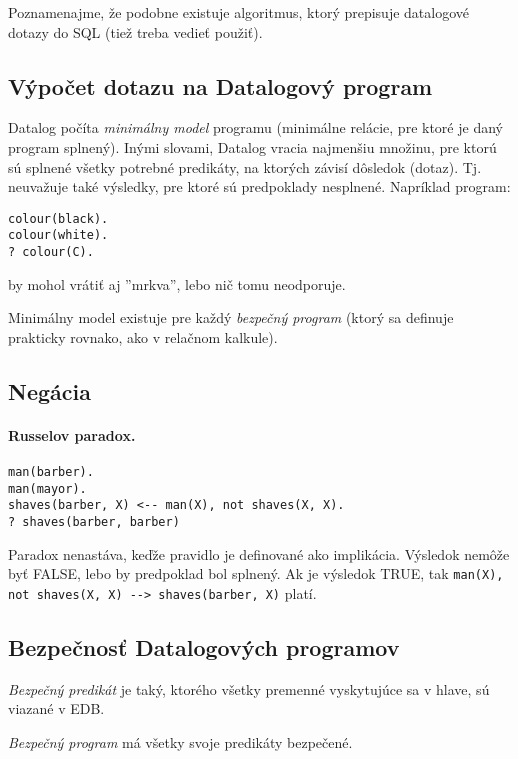 \documentclass[10pt,a4paper]{article}
\begin{document}
Poznamenajme, že podobne existuje algoritmus, ktorý prepisuje datalogové dotazy do SQL (tiež treba vedieť použiť). 

\subsection{Výpočet dotazu na Datalogový program}

Datalog počíta \emph{minimálny model} programu (minimálne relácie, pre ktoré je daný program splnený). Inými slovami, Datalog vracia najmenšiu množinu, pre ktorú sú splnené všetky potrebné predikáty, na ktorých závisí dôsledok (dotaz). Tj. neuvažuje také výsledky, pre ktoré sú predpoklady nesplnené. Napríklad program: 
\begin{verbatim}
colour(black).
colour(white).
? colour(C).
\end{verbatim}
by mohol vrátiť aj ''mrkva'', lebo nič tomu neodporuje.

Minimálny model existuje pre každý \emph{bezpečný program} (ktorý sa definuje prakticky rovnako, ako v relačnom kalkule).

\subsection{Negácia}

\paragraph{Russelov paradox.}
\begin{verbatim}
man(barber).
man(mayor).
shaves(barber, X) <-- man(X), not shaves(X, X).
? shaves(barber, barber)
\end{verbatim}

Paradox nenastáva, keďže pravidlo je definované ako implikácia. Výsledok nemôže byť FALSE,
lebo by predpoklad bol splnený. Ak je výsledok TRUE, tak \verb|man(X), not shaves(X, X) --> shaves(barber, X)| platí. 

\subsection{Bezpečnosť Datalogových programov}

\emph{Bezpečný predikát} je taký, ktorého všetky premenné vyskytujúce sa v hlave, sú viazané v EDB. 

\emph{Bezpečný program} má všetky svoje predikáty bezpečené. 
\end{document}
